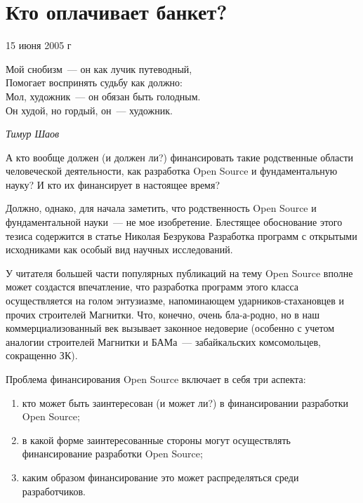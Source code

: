 \section{Кто оплачивает банкет?} 
\begin{timeline}15 июня 2005 г\end{timeline}

\hfill \begin{minipage}[h]{0.45\textwidth}
Мой снобизм~--- он как лучик путеводный,\\
Помогает воспринять судьбу как должно:\\
Мол, художник~--- он обязан быть голодным. \\
Он худой, но гордый, он~--- художник.
\begin{flushright}
\textit{Тимур Шаов}
\end{flushright}
\bigskip\end{minipage}

А кто вообще должен (и должен ли?) финансировать такие родственные области человеческой деятельности, как разработка Open Source и фундаментальную науку? И кто их финансирует в настоящее время?

Должно, однако, для начала заметить, что родственность Open Source и фундаментальной науки~--- не мое изобретение. Блестящее обоснование этого тезиса содержится в статье Николая Безрукова Разработка программ с открытыми исходниками как особый вид научных исследований.

У читателя большей части популярных публикаций на тему Open Source вполне может создастся впечатление, что разработка программ этого класса осуществляется на голом энтузиазме, напоминающем ударников-стахановцев и прочих строителей Магнитки. Что, конечно, очень бла-а-родно, но в наш коммерциализованный век вызывает законное недоверие (особенно с учетом аналогии строителей Магнитки и БАМа~--- забайкальских комсомольцев, сокращенно ЗК).

Проблема финансирования Open Source включает в себя три аспекта:


\begin{enumerate}
	\item кто может быть заинтересован (и может ли?) в финансировании разработки Open Source;
	\item в какой форме заинтересованные стороны могут осуществлять финансирование разработки Open Source;
	\item каким образом финансирование это может распределяться среди разработчиков.
\end{enumerate}


